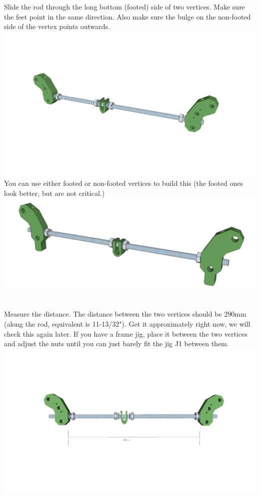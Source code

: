 	\section{}
	Slide the rod through the long bottom (footed) side of two vertices. Make sure the feet point in the same
	direction. Also make sure the bulge on the non-footed side of the vertex points
	outwards. \\
	\includegraphics[width=1\linewidth]{graphics/ch1_6_1.png} \\
	You can use either footed or non-footed vertices to build this (the footed ones
	look better, but are not critical.) \\
	\includegraphics[width=1\linewidth]{graphics/ch1_6_2.png}
	
	\section{}
	Measure the distance. The distance between the two vertices should be 290mm (along the rod,
	equivalent is 11-13/32"). Get it approximately right now, we will check this again later. If you have a
	frame jig, place it between the two vertices and adjust the nuts until you can just barely fit the jig J1
	between them. \\
	\includegraphics[width=1\linewidth]{graphics/ch1_7.png}
	

